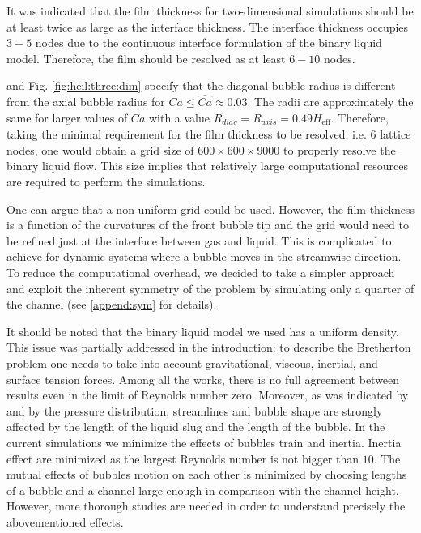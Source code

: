 \documentclass[preprint,12pt]{elsarticle}
\begin{document}
It was indicated \cite{kuzmin-binary2d} that the film thickness for two-dimensional simulations should be at least twice as large
as the interface thickness. The interface thickness occupies $3-5$ nodes due to the continuous
interface formulation of the binary liquid model. Therefore, the
film should be
resolved as at least $6-10$ nodes. 

\citet{heil-threedim} and Fig. \ref{fig:heil:three:dim} specify that the diagonal bubble radius is
different from the
axial bubble radius for $Ca\leq \widehat{Ca}\approx 0.03$. The radii are approximately the same for
larger values
of
$Ca$ with a value $R_{diag}=R_{axis}=0.49 H_{\mathrm{eff}}$. Therefore, taking the minimal
requirement for the film thickness to be
resolved, i.e. $6$ lattice nodes, one would obtain a grid size of $600\times 600 \times 9000 $ to
properly resolve the binary liquid flow. This size implies that relatively
large
computational resources are required to perform the simulations.

One can argue that a non-uniform grid could be used. However, the film thickness is a
function of the curvatures of the front bubble tip \cite{bretherton} and the grid would need to
be refined just at the interface between gas and liquid. This is complicated to achieve for
dynamic systems where a bubble moves in the streamwise direction.
To reduce the computational overhead, we decided to take a simpler approach and exploit the
inherent symmetry of the problem by simulating only a quarter of the channel (see
\ref{append:sym} for details).

It should be noted that the binary liquid model we used has a uniform density. This issue was
partially addressed in the introduction:  to describe the Bretherton problem one needs to take into
account gravitational, viscous, inertial, and surface tension forces. Among all the works, there
is no full 
agreement between results even in the limit of Reynolds number zero. Moreover,
as was indicated
by \citet{kreutzer-taylor} and by \citet{cerro-bubble-train} the pressure distribution, streamlines
and bubble shape are strongly affected by the length of the liquid slug and the length of the
bubble. In the current simulations we minimize the effects of bubbles train and inertia. Inertia
effect are minimized as the largest Reynolds number is not bigger than $10$. The mutual
effects of bubbles motion on each other is minimized by choosing lengths of a bubble and a
channel large enough in comparison with the channel height. However, more thorough studies are
needed in order to understand
precisely the abovementioned effects.
\end{document}
